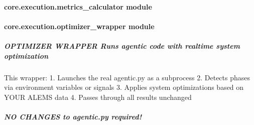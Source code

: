 \documentclass[letterpaper,10pt,english]{sphinxmanual}
\begin{document}
\sphinxstepscope


\paragraph{core.execution.metrics\_calculator module}
\label{\detokenize{core.execution.metrics_calculator:module-core.execution.metrics_calculator}}\label{\detokenize{core.execution.metrics_calculator:core-execution-metrics-calculator-module}}\label{\detokenize{core.execution.metrics_calculator::doc}}
\sphinxstepscope


\paragraph{core.execution.optimizer\_wrapper module}
\label{\detokenize{core.execution.optimizer_wrapper:module-core.execution.optimizer_wrapper}}\label{\detokenize{core.execution.optimizer_wrapper:core-execution-optimizer-wrapper-module}}\label{\detokenize{core.execution.optimizer_wrapper::doc}}

\subparagraph{OPTIMIZER WRAPPER \sphinxhyphen{} Runs agentic code with real\sphinxhyphen{}time system optimization}
\label{\detokenize{core.execution.optimizer_wrapper:optimizer-wrapper-runs-agentic-code-with-real-time-system-optimization}}
\sphinxAtStartPar
This wrapper:
1. Launches the real agentic.py as a subprocess
2. Detects phases via environment variables or signals
3. Applies system optimizations based on YOUR A\sphinxhyphen{}LEMS data
4. Passes through all results unchanged


\subparagraph{NO CHANGES to agentic.py required!}
\label{\detokenize{core.execution.optimizer_wrapper:no-changes-to-agentic-py-required}}
\end{document}
